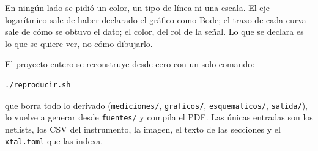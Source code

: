 \noindent
En ningún lado se pidió un color, un tipo de línea ni una escala. El eje
logarítmico sale de haber declarado el gráfico como Bode; el trazo de cada curva
sale de cómo se obtuvo el dato; el color, del rol de la señal. Lo que se declara
es lo que se quiere ver, no cómo dibujarlo.

\vspace{0.6em}
\noindent
El proyecto entero se reconstruye desde cero con un solo comando:

\begin{lstlisting}[language=consola]
./reproducir.sh
\end{lstlisting}

\noindent
que borra todo lo derivado (\texttt{mediciones/}, \texttt{graficos/},
\texttt{esquematicos/}, \texttt{salida/}), lo vuelve a generar desde
\texttt{fuentes/} y compila el PDF. Las únicas entradas son los netlists, los
CSV del instrumento, la imagen, el texto de las secciones y el
\texttt{xtal.toml} que las indexa.
